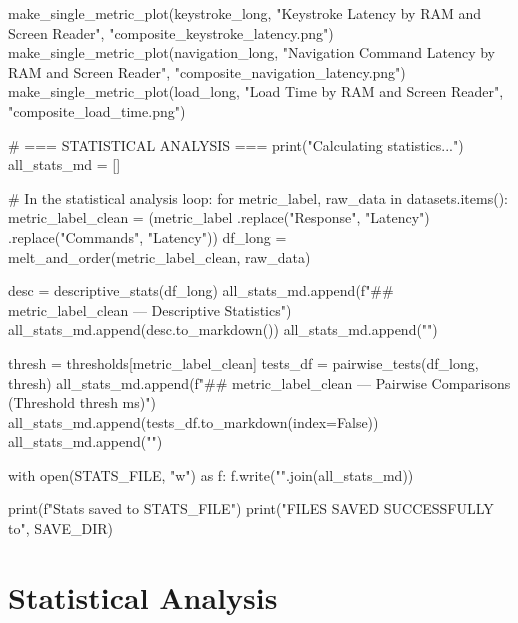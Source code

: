 \begin{pyverbatim}
make_single_metric_plot(keystroke_long, "Keystroke Latency by RAM and Screen Reader", "composite_keystroke_latency.png")
make_single_metric_plot(navigation_long, "Navigation Command Latency by RAM and Screen Reader", "composite_navigation_latency.png")
make_single_metric_plot(load_long, "Load Time by RAM and Screen Reader", "composite_load_time.png")

# === STATISTICAL ANALYSIS ===
print("Calculating statistics...")
all_stats_md = []

# In the statistical analysis loop:
for metric_label, raw_data in datasets.items():
    metric_label_clean = (metric_label
                          .replace("Response", "Latency")
                          .replace("Commands", "Latency"))
    df_long = melt_and_order(metric_label_clean, raw_data)

    desc = descriptive_stats(df_long)
    all_stats_md.append(f"## {metric_label_clean} — Descriptive Statistics\n")
    all_stats_md.append(desc.to_markdown())
    all_stats_md.append("\n")

    thresh = thresholds[metric_label_clean]
    tests_df = pairwise_tests(df_long, thresh)
    all_stats_md.append(f"## {metric_label_clean} — Pairwise Comparisons (Threshold {thresh} ms)\n")
    all_stats_md.append(tests_df.to_markdown(index=False))
    all_stats_md.append("\n")


with open(STATS_FILE, "w") as f:
    f.write("\n".join(all_stats_md))

print(f"Stats saved to {STATS_FILE}")
print("\nALL FILES SAVED SUCCESSFULLY to", SAVE_DIR)
\end{pyverbatim}

\section{Statistical Analysis}

